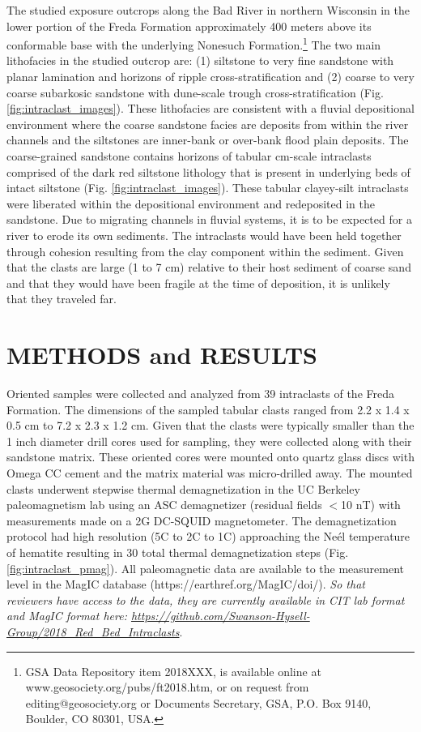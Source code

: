 \documentclass[11pt,letterpaper]{article}
\begin{document}
The studied exposure outcrops along the Bad River in northern Wisconsin in the lower portion of the Freda Formation approximately 400 meters above its conformable base with the underlying Nonesuch Formation.\footnote{GSA Data Repository item 2018XXX, is available online at www.geosociety.org/pubs/ft2018.htm, or on request from editing@geosociety.org or Documents Secretary, GSA, P.O. Box 9140, Boulder, CO 80301, USA.} The two main lithofacies in the studied outcrop are: (1) siltstone to very fine sandstone with planar lamination and horizons of ripple cross-stratification and (2) coarse to very coarse subarkosic sandstone with dune-scale trough cross-stratification (Fig. \ref{fig:intraclast_images}).  These lithofacies are consistent with a fluvial depositional environment where the coarse sandstone facies are deposits from within the river channels and the siltstones are inner-bank or over-bank flood plain deposits. The coarse-grained sandstone contains horizons of tabular cm-scale intraclasts comprised of the dark red siltstone lithology that is present in underlying beds of intact siltstone (Fig. \ref{fig:intraclast_images}). These tabular clayey-silt intraclasts were liberated within the depositional environment and redeposited in the sandstone. Due to migrating channels in fluvial systems, it is to be expected for a river to erode its own sediments. The intraclasts would have been held together through cohesion resulting from the clay component within the sediment. Given that the clasts are large (1 to 7 cm) relative to their host sediment of coarse sand and that they would have been fragile at the time of deposition, it is unlikely that they traveled far. 

\section*{METHODS and RESULTS}

Oriented samples were collected and analyzed from 39 intraclasts of the Freda Formation. The dimensions of the sampled tabular clasts ranged from 2.2 x 1.4 x 0.5 cm to 7.2 x 2.3 x 1.2 cm. Given that the clasts were typically smaller than the 1 inch diameter drill cores used for sampling, they were collected along with their sandstone matrix. These oriented cores were mounted onto quartz glass discs with Omega CC cement and the matrix material was micro-drilled away. The mounted clasts underwent stepwise thermal demagnetization in the UC Berkeley paleomagnetism lab using an ASC demagnetizer (residual fields $<$10 nT) with measurements made on a 2G DC-SQUID magnetometer. The demagnetization protocol had high resolution (5\textdegree C to 2\textdegree C to 1\textdegree C) approaching the Ne\'el temperature of hematite resulting in 30 total thermal demagnetization steps (Fig. \ref{fig:intraclast_pmag}). All paleomagnetic data are available to the measurement level in the MagIC database (https://earthref.org/MagIC/doi/). \textit{So that reviewers have access to the data, they are currently available in CIT lab format and MagIC format here: \url{https://github.com/Swanson-Hysell-Group/2018_Red_Bed_Intraclasts}}. 
\end{document}
